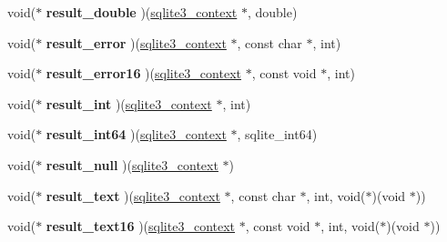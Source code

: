 \begin{DoxyCompactItemize}
\item 
void($\ast$ {\bfseries result\+\_\+double} )(\hyperlink{structsqlite3__context}{sqlite3\+\_\+context} $\ast$, double)\hypertarget{structsqlite3__api__routines_a2a30d668aa648384ab1058cf77924c33}{}\label{structsqlite3__api__routines_a2a30d668aa648384ab1058cf77924c33}

\item 
void($\ast$ {\bfseries result\+\_\+error} )(\hyperlink{structsqlite3__context}{sqlite3\+\_\+context} $\ast$, const char $\ast$, int)\hypertarget{structsqlite3__api__routines_aa056e7b903ab75742336977a511ef14c}{}\label{structsqlite3__api__routines_aa056e7b903ab75742336977a511ef14c}

\item 
void($\ast$ {\bfseries result\+\_\+error16} )(\hyperlink{structsqlite3__context}{sqlite3\+\_\+context} $\ast$, const void $\ast$, int)\hypertarget{structsqlite3__api__routines_a70665eda481c4fcafdfd1462700be04e}{}\label{structsqlite3__api__routines_a70665eda481c4fcafdfd1462700be04e}

\item 
void($\ast$ {\bfseries result\+\_\+int} )(\hyperlink{structsqlite3__context}{sqlite3\+\_\+context} $\ast$, int)\hypertarget{structsqlite3__api__routines_aca3c3c95e95664898bf88da2e509e5af}{}\label{structsqlite3__api__routines_aca3c3c95e95664898bf88da2e509e5af}

\item 
void($\ast$ {\bfseries result\+\_\+int64} )(\hyperlink{structsqlite3__context}{sqlite3\+\_\+context} $\ast$, sqlite\+\_\+int64)\hypertarget{structsqlite3__api__routines_a92556e67d3485c59031e3d3acf401501}{}\label{structsqlite3__api__routines_a92556e67d3485c59031e3d3acf401501}

\item 
void($\ast$ {\bfseries result\+\_\+null} )(\hyperlink{structsqlite3__context}{sqlite3\+\_\+context} $\ast$)\hypertarget{structsqlite3__api__routines_a00666e8dbc927015e5885d8397fe87b5}{}\label{structsqlite3__api__routines_a00666e8dbc927015e5885d8397fe87b5}

\item 
void($\ast$ {\bfseries result\+\_\+text} )(\hyperlink{structsqlite3__context}{sqlite3\+\_\+context} $\ast$, const char $\ast$, int, void($\ast$)(void $\ast$))\hypertarget{structsqlite3__api__routines_aab7d23eb300244a843b8b88f07253b17}{}\label{structsqlite3__api__routines_aab7d23eb300244a843b8b88f07253b17}

\item 
void($\ast$ {\bfseries result\+\_\+text16} )(\hyperlink{structsqlite3__context}{sqlite3\+\_\+context} $\ast$, const void $\ast$, int, void($\ast$)(void $\ast$))\hypertarget{structsqlite3__api__routines_a65aabe03e23304ceb885829bf2393aa5}{}\label{structsqlite3__api__routines_a65aabe03e23304ceb885829bf2393aa5}


\end{DoxyCompactItemize}
